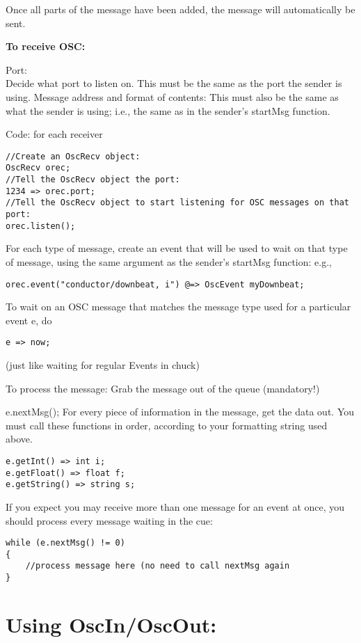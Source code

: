 Once all parts of the message have been added, the message will automatically be sent.

\textbf{To receive OSC: }

Port: \\
Decide what port to listen on. This must be the same as the port the sender is using. Message address and format of contents: This must also be the same as what the sender is using; i.e., the same as in the sender's startMsg function. 

Code: for each receiver 
\begin{verbatim}
//Create an OscRecv object: 
OscRecv orec; 
//Tell the OscRecv object the port: 
1234 => orec.port; 
//Tell the OscRecv object to start listening for OSC messages on that port: 
orec.listen(); 
\end{verbatim}

For each type of message, create an event that will be used to wait on that type of message, using the same argument as the sender's startMsg function: e.g., 

\begin{verbatim}
orec.event("conductor/downbeat, i") @=> OscEvent myDownbeat; 
\end{verbatim}

To wait on an OSC message that matches the message type used for a particular event e, do 
\begin{verbatim}
e => now; 
\end{verbatim}

(just like waiting for regular Events in chuck) 

To process the message: Grab the message out of the queue (mandatory!) 

e.nextMsg(); 
For every piece of information in the message, get the data out. You must call these functions in order, according to your formatting string used above. 
\begin{verbatim}
e.getInt() => int i; 
e.getFloat() => float f; 
e.getString() => string s; 
\end{verbatim}

If you expect you may receive more than one message for an event at once, you should process every message waiting in the cue: 

\begin{verbatim}
while (e.nextMsg() != 0) 
{ 
	//process message here (no need to call nextMsg again 
}
\end{verbatim}


\section*{Using OscIn/OscOut:}

